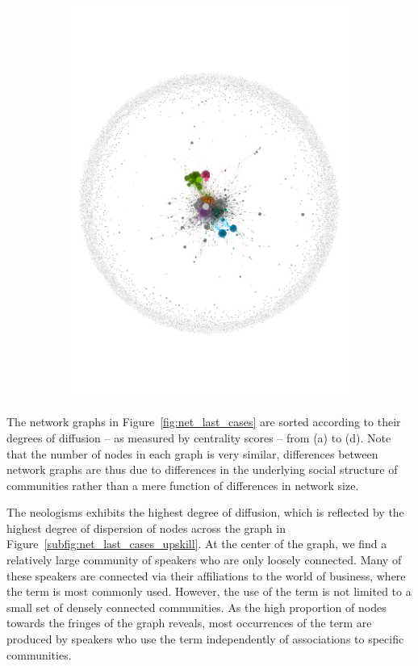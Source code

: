 \documentclass[
  a4paper,
  abstract=on,
  captions=tableabove
  ]{scrartcl}
\begin{document}
\begin{figure}
\begin{subfigure}{.45\linewidth}
          \includegraphics[width=\linewidth, height=\textheight, keepaspectratio]{img/net_solopreneur_four.pdf}
        \end{subfigure}
      \end{figure}

      The network graphs in Figure~\ref{fig:net_last_cases} are sorted according to their degrees of diffusion -- as measured by centrality scores -- from (a) to (d). Note that the number of nodes in each graph is very similar, differences between network graphs are thus due to differences in the underlying social structure of communities rather than a mere function of differences in network size.

      The neologisms  exhibits the highest degree of diffusion, which is reflected by the highest degree of dispersion of nodes across the graph in Figure~\ref{subfig:net_last_cases_upskill}. At the center of the graph, we find a relatively large community of speakers who are only loosely connected. Many of these speakers are connected via their affiliations to the world of business, where the term  is most commonly used. However, the use of the term is not limited to a small set of densely connected communities. As the high proportion of nodes towards the fringes of the graph reveals, most occurrences of the term are produced by speakers who use the term independently of associations to specific communities. 
\end{document}
